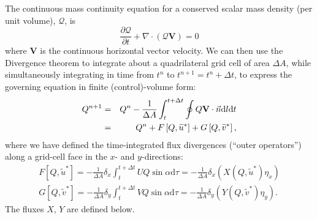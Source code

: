 \documentclass[10pt,letterpaper,margin=1in]{memoir}
\begin{document}
The continuous mass continuity equation for a conserved scalar mass density (per unit volume), $\mathcal{Q}$, is 
\begin{equation}
\frac{\partial \mathcal{Q}}{\partial t} + \nabla \cdot \left ( \mathcal{Q}\mathbf{V} \right ) = 0 \label{eqn:masscont}
\end{equation}
where ${\mathbf{V}}$ is the continuous horizontal vector velocity. We can then use the Divergence theorem to integrate about a quadrilateral grid cell of area $\Delta A$, while simultaneously integrating in time from $t^n$ to $t^{n+1} = t^{n} + \Delta t$, to express the governing equation in finite (control)-volume form:
\begin{eqnarray}\notag
{Q}^{n+1} &=&{Q}^{n} - \frac{1}{\Delta A} \int^{t+\Delta t}_{t} \oint  {Q}\mathbf{V} \cdot \vec{n} \mathrm{d} l \mathrm{d} t \\ \label{eqn:Qfull}
& = & {Q}^{n} + F\left[Q, \widetilde{u}^*\right] + G\left[Q, \widetilde{v}^*\right],
\end{eqnarray}
where we have defined the time-integrated flux divergences (``outer operators'') along a grid-cell face in the $x$- and $y$-directions:
\begin{equation} \label{eqn:outeroperators} 
\begin{aligned}
F\left[Q, \widetilde{u}^*\right] = - \frac{1}{\Delta A} \delta_x \int^{t+\Delta t}_{t} U Q \sin \alpha \mathrm{d}\tau = - \frac{1}{\Delta A} \delta_x \left( X \left (Q, \widetilde{u}^* \right ) \eta_x \right ) \\
G\left[Q, \widetilde{v}^*\right] = - \frac{1}{\Delta A} \delta_y \int^{t+\Delta t}_{t} V Q \sin \alpha \mathrm{d}\tau = - \frac{1}{\Delta A} \delta_y \left ( Y \left (Q, \widetilde{v}^* \right ) \eta_y \right ).
\end{aligned}
\end{equation}
The fluxes $X$, $Y$ are defined below. 
\end{document}
